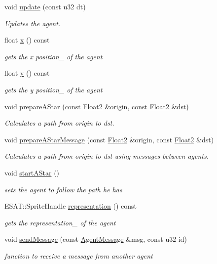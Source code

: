 \begin{DoxyCompactItemize}
void \mbox{\hyperlink{class_agent_af558d97ffafcfedd4a18c02a8ae2d6e1}{update}} (const u32 dt)
\begin{DoxyCompactList}\small\item\em Updates the agent. \end{DoxyCompactList}\item 
float \mbox{\hyperlink{class_agent_a51aac7a6281e83d26d4c85475851cbf4}{x}} () const
\begin{DoxyCompactList}\small\item\em gets the x position\+\_\+ of the agent \end{DoxyCompactList}\item 
float \mbox{\hyperlink{class_agent_a077acfc535e9ef3b0630beaa818627a4}{y}} () const
\begin{DoxyCompactList}\small\item\em gets the y position\+\_\+ of the agent \end{DoxyCompactList}\item 
void \mbox{\hyperlink{class_agent_a6c15063ebfaaf37ba467f2086849dd9d}{prepare\+A\+Star}} (const \mbox{\hyperlink{class_float2}{Float2}} \&origin, const \mbox{\hyperlink{class_float2}{Float2}} \&dst)
\begin{DoxyCompactList}\small\item\em Calculates a path from origin to dst. \end{DoxyCompactList}\item 
void \mbox{\hyperlink{class_agent_aa5429086a4b2f6b954aa914f97d92366}{prepare\+A\+Star\+Message}} (const \mbox{\hyperlink{class_float2}{Float2}} \&origin, const \mbox{\hyperlink{class_float2}{Float2}} \&dst)
\begin{DoxyCompactList}\small\item\em Calculates a path from origin to dst using messages between agents. \end{DoxyCompactList}\item 
void \mbox{\hyperlink{class_agent_a23ff42a863144f125494340ca48a5755}{start\+A\+Star}} ()
\begin{DoxyCompactList}\small\item\em sets the agent to follow the path he has \end{DoxyCompactList}\item 
E\+S\+A\+T\+::\+Sprite\+Handle \mbox{\hyperlink{class_agent_a5ef49d1f2efe42bb70339c30c82789ce}{representation}} () const
\begin{DoxyCompactList}\small\item\em gets the representation\+\_\+ of the agent \end{DoxyCompactList}\item 
void \mbox{\hyperlink{class_agent_a1213f4de6f642d4a0823685ed642068b}{send\+Message}} (const \mbox{\hyperlink{class_agent_message}{Agent\+Message}} \&msg, const u32 id)
\begin{DoxyCompactList}\small\item\em function to receive a message from another agent \end{DoxyCompactList}\end{DoxyCompactItemize}


